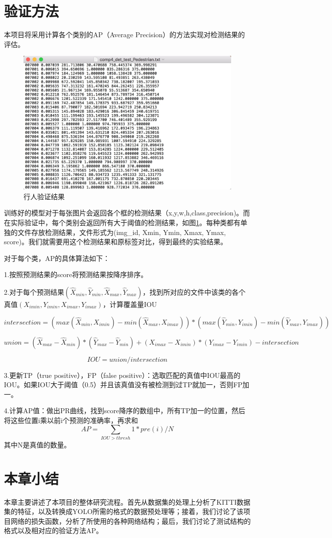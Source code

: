 \section{验证方法}{
	本项目将采用计算各个类别的AP（Average Precision）的方法实现对检测结果的评估\cite{VOC}。

	\begin{figure}[htbp]
	\centering
	\includegraphics[width=5in]{images/results.png}
	\caption{行人验证结果}
	\label{results}
	\end{figure}
	训练好的模型对于每张图片会返回各个框的检测结果（x,y,w,h,class,precision)。而在实际验证中，每个类别会返回所有大于阈值的检测结果，如图\ref{results}。每种类都有单独的文件存放检测结果，文件形式为(img\_id, Xmin, Ymin, Xmax, Ymax, score)。我们就需要用这个检测结果和原标签对比，得到最终的实验结果。

	对于每个类，AP的具体算法如下：

	1.按照预测结果的score将预测结果按降序排序。

	2.对于每个预测结果$(\hat{X}_{min},\hat{Y}_{min},\hat{X}_{max},\hat{Y}_{max})$，找到所对应的文件中该类的各个真值$({X}_{imin},{Y}_{imin},{X}_{imax},{Y}_{imax})$，计算覆盖量IOU

	$$intersection = (max(\hat{X}_{min},{X}_{imin}) - min(\hat{X}_{max},{X}_{imax})) * (max(\hat{Y}_{min},{Y}_{imin}) - min(\hat{Y}_{max},{Y}_{imax}))$$

	$$union = (\hat{X}_{max} - \hat{X}_{min}) * (\hat{Y}_{max} - \hat{Y}_{min}) + ({X}_{imax} - {X}_{imin}) * ({Y}_{imax} - {Y}_{imin}) - intersection$$

	$$IOU = union / intersection$$

	3.更新TP（true positive），FP（false positive）：选取匹配的真值中IOU最高的IOU。如果IOU大于阈值（0.5）并且该真值没有被检测到过TP就加一，否则FP加一。

	4.计算AP值：做出PR曲线，找到score降序的数组中，所有TP加一的位置，然后将这些位置i乘以前i个预测的准确率，再求和
	$$AP = \sum_{IOU>thresh}1*pre(i) / N$$其中N是真值的数量。
}

\section{本章小结}{
	本章主要讲述了本项目的整体研究流程。首先从数据集的处理上分析了KITTI数据集的特征，以及转换成YOLO所需的格式的数据预处理等；接着，我们讨论了该项目网络的损失函数，分析了所使用的各种网络结构；最后，我们讨论了测试结构的格式以及相对应的验证方法AP。
}

